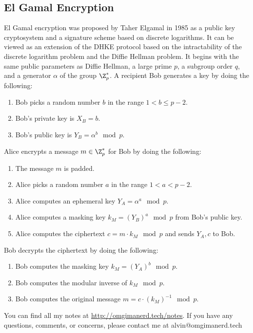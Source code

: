 \documentclass{math}
\begin{document}
\subsection*{El Gamal Encryption}
El Gamal encryption was proposed by Taher Elgamal in 1985 as a public key
cryptosystem and a signature scheme based on discrete logarithms. It can
be viewed as an extension of the DHKE protocol based on the intractability of
the discrete logarithm problem and the Diffie Hellman problem. It begins
with the same public parameters as Diffie Hellman, a large prime \( p \),
a subgroup order \( q \), and a generator \( \alpha \) of the group
\( \Z_p^{*} \). A recipient Bob generates a key by doing the following:
\begin{enumerate}
  \item Bob picks a random number \( b \) in the range \( 1<b\le p-2 \).
  \item Bob's private key is \( X_B = b \).
  \item Bob's public key is \( Y_B = \alpha^b\mod p \).
\end{enumerate}
Alice encrypts a message \( m\in\Z_p^{*} \) for Bob by doing the following:
\begin{enumerate}
  \item The message \( m \) is padded.
  \item Alice picks a random number \( a \) in the range \( 1<a<p-2 \).
  \item Alice computes an ephemeral key \( Y_A = \alpha^a\mod p \).
  \item Alice computes a masking key \( k_M = (Y_B)^a\mod p \) from Bob's
  public key.
  \item Alice computes the ciphertext \( c = m\cdot k_M\mod p \) and sends
  \( Y_A, c \) to Bob.
\end{enumerate}
Bob decrypts the ciphertext by doing the following:
\begin{enumerate}
  \item Bob computes the masking key \( k_M = (Y_A)^b\mod p \).
  \item Bob computes the modular inverse of \( k_M\mod p \).
  \item Bob computes the original message \( m = c\cdot (k_M)^{-1}\mod p \).
\end{enumerate}

\begin{center}
  You can find all my notes at \url{http://omgimanerd.tech/notes}. If you have
  any questions, comments, or concerns, please contact me at
  alvin@omgimanerd.tech
\end{center}
\end{document}
